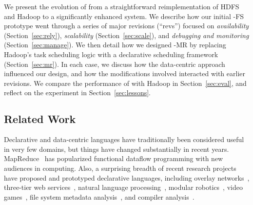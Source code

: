 

We present the evolution of \BOOMA from a straightforward reimplementation of
HDFS and Hadoop to a significantly enhanced system.  We describe how our initial
\BOOM-FS prototype went through a series of major revisions (``revs'') focused
on \emph{availability} (Section~\ref{sec:rely}), \emph{scalability}
(Section~\ref{sec:scale}), and \emph{debugging and monitoring}
(Section~\ref{sec:manage}). We then detail how we designed \BOOM-MR by replacing
Hadoop's task scheduling logic with a declarative scheduling framework
(Section~\ref{sec:mr}). In each case, we discuss how the
data-centric approach influenced our design, and how the modifications involved
interacted with earlier revisions.  We compare the performance of \BOOMA with
Hadoop in Section~\ref{sec:eval}, and reflect on the experiment in
Section~\ref{sec:lessons}.

\subsection{Related Work}
\label{sec:relwork}
Declarative and data-centric languages have traditionally been considered useful
in very few domains, but things have changed substantially in recent years.
MapReduce~\cite{mapreduce-osdi} has popularized functional dataflow programming
with new audiences in computing.  Also, a surprising breadth of recent research
projects have proposed and prototyped declarative languages, including overlay
networks~\cite{p2:sosp}, three-tier web services~\cite{hilda}, natural language
processing~\cite{dyna}, modular robotics~\cite{meld}, video
games~\cite{cornellgames}, file system metadata analysis~\cite{wiscfsck}, and
compiler analysis~\cite{bddbddb}.

